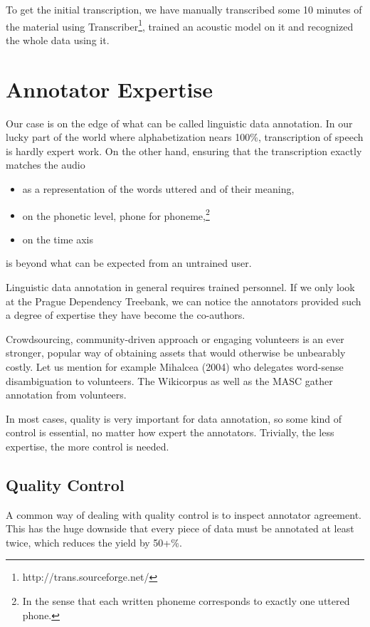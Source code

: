 \documentclass{itatnew}
\begin{document}
To get the initial transcription, we have manually transcribed some 10 minutes
of the material using Transcriber\footnote{http://trans.sourceforge.net/},
trained an acoustic model on it and recognized the whole data using it.

\section{Annotator Expertise}

Our case is on the edge of what can be called linguistic data annotation. In our
lucky part of the world where alphabetization nears 100\%, transcription of
speech is hardly expert work. On the other hand, ensuring that the transcription
exactly matches the audio
\begin{itemize}
\item{as a representation of the words uttered and of their meaning,}
\item{on the phonetic level, phone for phoneme,\footnote{In the sense that each
written phoneme corresponds to exactly one uttered phone.}}
\item{on the time axis}
\end{itemize}
is beyond what can be expected from an untrained user.

Linguistic data annotation in general requires trained personnel. If we only
look at the Prague Dependency Treebank, we can notice the annotators provided
such a degree of expertise they have become the
co-authors\cite{hajivc2005complex}.

Crowdsourcing, community-driven approach or engaging volunteers is an ever
stronger, popular way of obtaining assets that would otherwise be unbearably
costly. Let us mention for example Mihalcea (2004)\cite{mihalcea2004building}
who delegates word-sense disambiguation to volunteers. The
Wikicorpus\cite{reese2010wikicorpus} as well as the MASC\cite{ide2010manually}
gather annotation from volunteers.

In most cases, quality is very important for data annotation, so some kind of
control is essential, no matter how expert the annotators. Trivially, the less
expertise, the more control is needed.

\subsection{Quality Control}

A common way of dealing with quality control is to inspect annotator agreement.
This has the huge downside that every piece of data must be annotated at least
twice, which reduces the yield by 50+\%.
\end{document}
